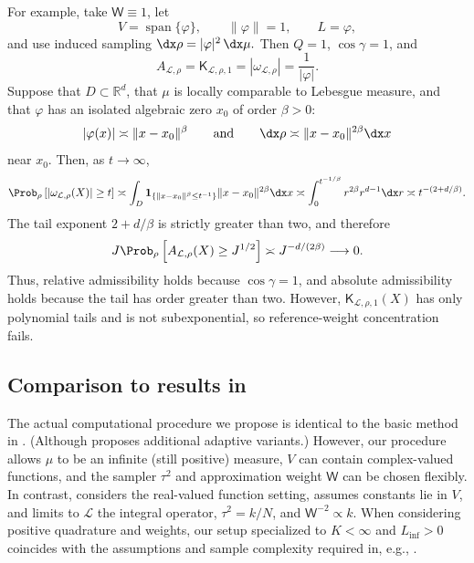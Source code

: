 \documentclass[10pt,dvipsnames]{amsart}
\begin{document}
For example, take \(\mathsf W\equiv1\), let
\[
    V=\operatorname{span}\{\varphi\},
    \qquad
    \|\varphi\|=1,
    \qquad
    L=\varphi,
\]
and use induced sampling
\(
    \dx\rho=|\varphi|^2\,\dx\mu.
\)
Then \(Q=1\), \(\cos\gamma=1\), and
\[
A_{\mathcal L,\rho}
=
\mathsf K_{\mathcal L,\rho,1}
=
|\omega_{\mathcal L,\rho}|
=
\frac1{|\varphi|}.
\]
Suppose that \(D\subset\mathbb R^d\), that \(\mu\) is locally comparable
to Lebesgue measure, and that \(\varphi\) has an isolated algebraic zero
\(x_0\) of order \(\beta>0\):
\[
    |\varphi(x)|
    \asymp
    \|x-x_0\|^\beta
    \qquad
    \text{and}
    \qquad
    \dx \rho \asymp \| x-x_0 \|^{2\beta} \dx x
\]
near \(x_0\). Then, as \(t\to\infty\),
\[
    \Prob_\rho\left[
        |\omega_{\mathcal L, \rho}(X)|\geq t
    \right]
    \asymp
    \int_{D}\mathbf 1_{\{\| x - x_0 \|^\beta \le t^{-1}\}} \| x - x_0 \|^{2\beta} \dx x
    \asymp
    \int_0^{t^{-1/ \beta }} r^{2\beta} r^{d-1}\dx r
    \asymp
    t^{-(2+d/\beta)}.
\]
The tail exponent \(2+d/\beta\) is strictly greater than two, and therefore
\[
    J\Prob_\rho\left[
        A_{\mathcal L, \rho}(X)\geq J^{1/2}
    \right]
    \asymp
    J^{-d/(2\beta)}
    \longrightarrow0.
\]
Thus, relative admissibility holds because \(\cos\gamma=1\), and absolute
admissibility holds because the tail has order greater than two. However,
 \(\mathsf K_{\mathcal L,\rho,1}(X)\) has only polynomial tails and is not
subexponential, so reference-weight concentration fails.

\subsection{Comparison to results in \cite{migliorati2022stable,schafer_2025}}

The actual computational procedure we propose is identical to the basic method
in \cite{migliorati2022stable}. (Although \cite{migliorati2022stable} proposes
additional adaptive variants.) However, our procedure allows $\mu$ to be an
infinite (still positive) measure, $V$ can contain complex-valued functions,
and the sampler $\tau^2$ and approximation weight $\mathsf W$ can be chosen
flexibly. In contrast, \cite{migliorati2022stable} considers the real-valued
function setting, assumes constants lie in $V$, and limits to $\mathcal{L}$ the
integral operator, $\tau^2 = k/N$, and $\mathsf W^{-2} \propto k$. When considering
positive quadrature and weights, our setup specialized to $K < \infty$ and
$L_{\inf} > 0$ coincides with the assumptions and sample complexity required in,
e.g., \cite[Theorem 6]{migliorati2022stable}.
\end{document}
